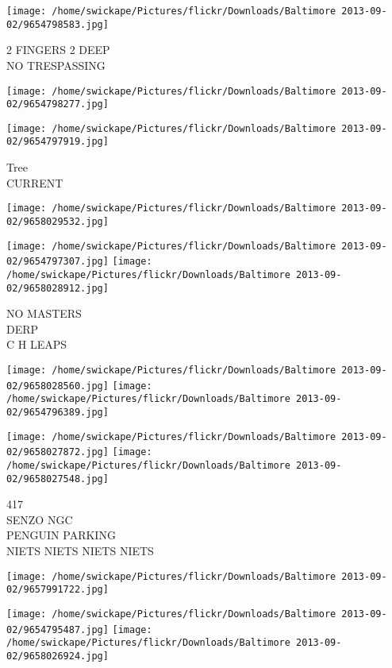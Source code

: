 \documentclass[10pt,letterpaper]{article}
\begin{document}
\vspace{0.25in}
\texttt{[image: /home/swickape/Pictures/flickr/Downloads/Baltimore 2013-09-02/9654798583.jpg]}

2 FINGERS 2 DEEP\\
NO TRESPASSING\\
\pagebreak

\texttt{[image: /home/swickape/Pictures/flickr/Downloads/Baltimore 2013-09-02/9654798277.jpg]}

\vspace{0.25in}
\texttt{[image: /home/swickape/Pictures/flickr/Downloads/Baltimore 2013-09-02/9654797919.jpg]}

Tree\\
CURRENT\\
\pagebreak

\texttt{[image: /home/swickape/Pictures/flickr/Downloads/Baltimore 2013-09-02/9658029532.jpg]}

\vspace{0.25in}
\texttt{[image: /home/swickape/Pictures/flickr/Downloads/Baltimore 2013-09-02/9654797307.jpg]}
\texttt{[image: /home/swickape/Pictures/flickr/Downloads/Baltimore 2013-09-02/9658028912.jpg]}

NO MASTERS\\
DERP\\
C H LEAPS\\
\pagebreak

\texttt{[image: /home/swickape/Pictures/flickr/Downloads/Baltimore 2013-09-02/9658028560.jpg]}
\texttt{[image: /home/swickape/Pictures/flickr/Downloads/Baltimore 2013-09-02/9654796389.jpg]}

\texttt{[image: /home/swickape/Pictures/flickr/Downloads/Baltimore 2013-09-02/9658027872.jpg]}
\texttt{[image: /home/swickape/Pictures/flickr/Downloads/Baltimore 2013-09-02/9658027548.jpg]}

417\\
SENZO NGC\\
PENGUIN PARKING\\
NIETS NIETS NIETS NIETS\\
\pagebreak

\texttt{[image: /home/swickape/Pictures/flickr/Downloads/Baltimore 2013-09-02/9657991722.jpg]}

\vspace{0.25in}
\texttt{[image: /home/swickape/Pictures/flickr/Downloads/Baltimore 2013-09-02/9654795487.jpg]}
\texttt{[image: /home/swickape/Pictures/flickr/Downloads/Baltimore 2013-09-02/9658026924.jpg]}
\end{document}
